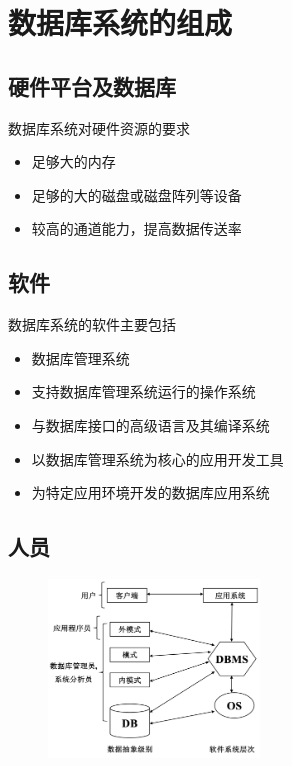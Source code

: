 \section{数据库系统的组成}

\subsection{硬件平台及数据库}
数据库系统对硬件资源的要求
\begin{itemize}
    \item 足够大的内存
    \item 足够的大的磁盘或磁盘阵列等设备
    \item 较高的通道能力，提高数据传送率
\end{itemize}

\subsection{软件}
数据库系统的软件主要包括
\begin{itemize}
    \item 数据库管理系统
    \item 支持数据库管理系统运行的操作系统
    \item 与数据库接口的高级语言及其编译系统
    \item 以数据库管理系统为核心的应用开发工具
    \item 为特定应用环境开发的数据库应用系统
\end{itemize}

\subsection{人员}
\begin{figure}[H]
    \vspace{-0.5em}
	\centering
	\includegraphics[width=0.5\textwidth]{images/1.4.3}
    \vspace{-1em}
\end{figure}

